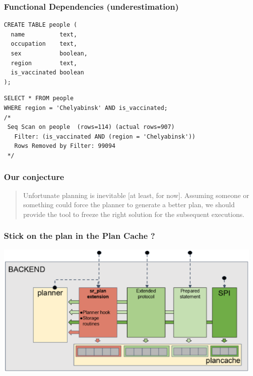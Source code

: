 \documentclass{beamer}
\begin{document}
\begin{frame}[fragile]\frametitle{Functional Dependencies (underestimation)}
\begin{lstlisting}[basicstyle=\footnotesize]
CREATE TABLE people (
  name          text,
  occupation    text,
  sex           boolean,
  region        text,
  is_vaccinated boolean
);
\end{lstlisting}
\begin{lstlisting}[basicstyle=\footnotesize]
SELECT * FROM people
WHERE region = 'Chelyabinsk' AND is_vaccinated;
/*
 Seq Scan on people  (rows=114) (actual rows=907)
   Filter: (is_vaccinated AND (region = 'Chelyabinsk'))
   Rows Removed by Filter: 99094
 */
\end{lstlisting}
\end{frame}

\begin{frame}[fragile]\frametitle{Our conjecture}
\begin{quote}
Unfortunate planning is inevitable [at least, for now]. Assuming someone or something could force the planner to generate a better plan, we should provide the tool to freeze the right solution for the subsequent executions.
\end{quote}
\end{frame}

\begin{frame}[fragile]\frametitle{Stick on the plan in the Plan Cache ?}
\begin{center}
  \includegraphics[width=\textwidth]{plancache_callers}
\end{center}
\end{frame}
\end{document}
